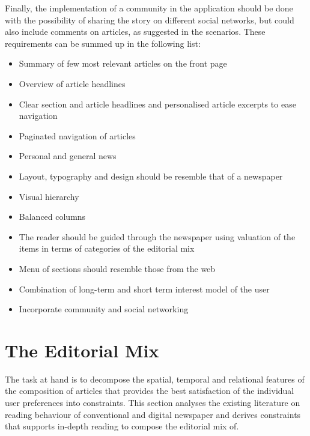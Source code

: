 Finally, the implementation of a community in the application should be done with the possibility of sharing the story on different social networks, but could also include comments on articles, as suggested in the scenarios.
\clearpage
These requirements can be summed up in the following list:
\begin{itemize}\itemdist
	\item Summary of few most relevant articles on the front page
	\item Overview of article headlines
	\item Clear section and article headlines and personalised article excerpts to ease navigation
	\item Paginated navigation of articles
	\item Personal and general news
	\item Layout, typography and design should be resemble that of a newspaper
	\item Visual hierarchy
	\item Balanced columns%
	\item The reader should be guided through the newspaper using valuation of the items in terms of categories of the editorial mix
	\item Menu of sections should resemble those from the web
	\item Combination of long-term and short term interest model of the user
	\item Incorporate community and social networking
\end{itemize}

\section{The Editorial Mix}%
The task at hand is to decompose the spatial, temporal and relational features of the composition of articles that provides the best satisfaction of the individual user preferences into constraints. This section analyses the existing literature on reading behaviour of conventional and digital newspaper and derives constraints that supports in-depth reading to compose the editorial mix of.


